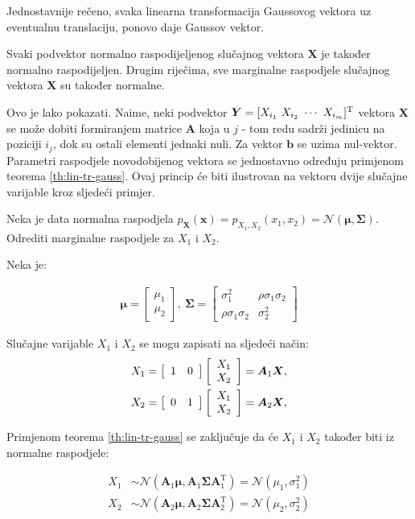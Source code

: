Jednostavnije rečeno, svaka linearna transformacija Gaussovog vektora uz
eventualnu translaciju, ponovo daje Gaussov vektor.

\begin{corollary}
	Svaki podvektor normalno raspodijeljenog slučajnog vektora $\bm X$ je također
	normalno raspodijeljen. Drugim riječima, sve marginalne raspodjele slučajnog
	vektora $\bm X$ su također normalne.
\end{corollary}

Ovo je lako pokazati. Naime, neki podvektor $\bm Y = [X_{i_1}\ X_{i_2}\ \cdots\
X_{i_m}]^\text T$ vektora $\bm X$ se može dobiti formiranjem matrice $\bm A$
koja u $j$ - tom redu sadrži jedinicu na poziciji $i_j$, dok su ostali elementi
jednaki nuli. Za vektor $\bm b$ se uzima nul-vektor.  Parametri raspodjele
novodobijenog vektora se jednostavno određuju primjenom teorema
\ref{th:lin-tr-gauss}. Ovaj princip će biti ilustrovan na vektoru dvije slučajne
varijable kroz sljedeći primjer.

\begin{exmp}
  Neka je data normalna raspodjela $p_{\bm X}(\bm x) = p_{X_1,X_2}(x_1, x_2) =
  \mathcal{N}(\bm\mu, \bm \Sigma)$. Odrediti marginalne raspodjele za $X_1$
  i $X_2$.
\end{exmp}

Neka je:

\begin{eqnarray} \label{eq:kovarijansa-2d}
	\bm\mu = \left[\begin{array}{c}
		\mu_1 \\ \mu_2
	\end{array}\right],\ 
	\bm\Sigma = \left[\begin{array}{cc}
	  \sigma_1^2 & \rho\sigma_1\sigma_2 \\  \rho\sigma_1\sigma_2 & \sigma_2^2
	\end{array}\right]
\end{eqnarray}

Slučajne varijable $X_1$ i $X_2$ se mogu zapisati na sljedeći način:
\begin{eqnarray}
	X_1 = \left[\begin{array}{cc}1&0\end{array}\right] \left[\begin{array}{c}X_1\\X_2\end{array}\right] = \bm A_1 \bm X,
	\\
	X_2 = \left[\begin{array}{cc}0&1\end{array}\right] \left[\begin{array}{c}X_1\\X_2\end{array}\right] = \bm A_2 \bm X,
\end{eqnarray}

Primjenom teorema \ref{th:lin-tr-gauss} se zaključuje da će $X_1$ i
$X_2$ također biti iz normalne raspodjele:

\begin{align*}
	X_1 &\sim \mathcal{N}(\bm A_1\bm\mu, \bm A_1 \bm\Sigma \bm A_1^\mathrm T)
		= \mathcal{N}(\mu_1, \sigma_1^2) \\
	X_2 &\sim \mathcal{N}(\bm A_2\bm\mu, \bm A_2 \bm\Sigma \bm A_2^\mathrm T)
		= \mathcal{N}(\mu_2, \sigma_2^2)
\end{align*}

